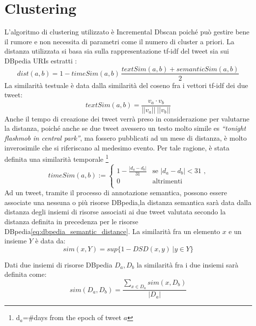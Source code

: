 \documentclass[a4paper,12pt]{report}
\begin{document}
\section{Clustering}
L'algoritmo di clustering utilizzato è Incremental Dbscan poiché può gestire bene il rumore e non necessita di parametri come il numero di cluster a priori. La distanza utilizzata si basa sia sulla rappresentazione tf-idf del tweet sia sui DBpedia URIs estratti :
\begin{equation}
dist(a,b)=1- timeSim(a,b)\,\frac{textSim(a,b)+semanticSim(a,b)}{2}
\end{equation}
La similarità testuale è data dalla similarità del coseno fra i vettori tf-idf dei due tweet:
\begin{equation*}
textSim(a,b)=\frac{v_a \cdot  v_b}{||v_a||\:||v_b||}
\end{equation*}
 Anche il tempo di creazione dei tweet verrà preso in considerazione per valutarne la distanza, poiché anche se due tweet avessero un testo molto simile es \emph{“tonight  flashmob in central park”}, ma fossero pubblicati ad un mese di distanza, è molto inverosimile che si riferiscano al medesimo evento. Per tale ragione, è stata definita una similarità temporale  \footnote{d$_a$=\#days from the epoch of tweet $a$}
\begin{equation*} 
timeSim(a,b):=\begin{cases}
1-\frac{|d_a-d_b|}{31} & \text{se $|d_a-d_b|<31 $  ,}\\
0 & \text{altrimenti}\\
\end{cases}
\end{equation*}
Ad un tweet, tramite il processo di annotazione semantica, possono essere associate una nessuna o più risorse DBpedia,la distanza semantica sarà data dalla distanza degli insiemi di risorse associati ai due tweet valutata secondo la distanza definita in precedenza per le risorse DBpedia\ref{eq:dbpedia_semantic_distance}. La similarità fra un elemento $x$ e un insieme $Y$ è data da:
\begin{equation*}
	sim(x,Y)=sup\{1-DSD(x,y)\:| y\in Y \}
\end{equation*}

Dati due insiemi di risorse DBpedia $D_a,D_b$ la similarità fra i due insiemi sarà definita come: 
\begin{equation}
sim(D_a,D_b)=\frac{\sum\limits_{x \in D_a} sim(x,D_b)  }{|D_a|} 
\end{equation}
\end{document}
